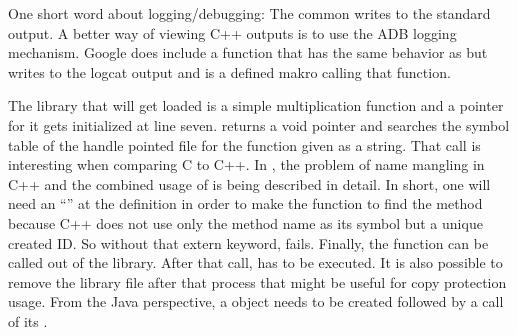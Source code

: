 One short word about logging/debugging: The common  writes to the standard output. A better way of viewing C++ outputs is to use the ADB logging mechanism. Google does include a  function that
has the same behavior as  but writes to the logcat output and 
 is a defined makro calling that function. 

The library that will get loaded is a simple multiplication function and a pointer
for it gets initialized at line seven.  returns a void pointer and
 searches the symbol table of the handle pointed file for the function
given as a string. That call is interesting when comparing C to C++. In 
\parencite{dlopen_howto}, the problem of name mangling in C++ and the combined usage of
 is being described in detail.
In short, one will need an ``'' at the  definition in order to make the  function to find the method
because C++ does not use only the method name as its symbol but a unique created ID.
So without that extern keyword,  fails.
Finally, the  function can be called out of the library.
After that call,  has to be executed. It is also possible to remove
the library file after that process that might be useful for copy protection usage.
From the Java perspective, a  object needs to be created followed by 
a call of its .

